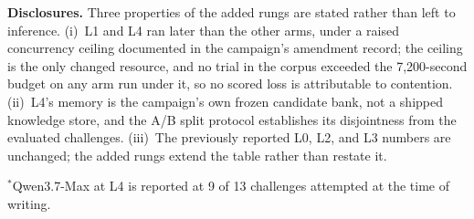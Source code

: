 \textbf{Disclosures.} Three properties of the added rungs are stated rather than
left to inference. (i)~L1 and L4 ran later than the other arms, under a raised
concurrency ceiling documented in the campaign's amendment record; the ceiling
is the only changed resource, and no trial in the corpus exceeded the
7,200-second budget on any arm run under it, so no scored loss is attributable
to contention. (ii)~L4's memory is the campaign's own frozen candidate bank, not
a shipped knowledge store, and the A/B split protocol establishes its
disjointness from the evaluated challenges. (iii)~The previously reported L0,
L2, and L3 numbers are unchanged; the added rungs extend the table rather than
restate it.

$^{*}$Qwen3.7-Max at L4 is reported at 9 of 13 challenges attempted at the time
of writing.
